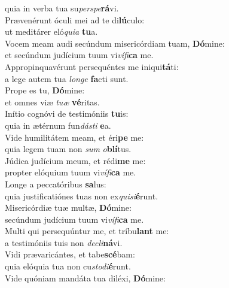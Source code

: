 \oddverse quia in verba tua su\textit{per}\textit{spe}\textbf{rá}vi.\\
\evenverse Prævenérunt óculi mei ad te di\textbf{lú}culo:~\*\\
\evenverse ut meditárer eló\textit{qui}\textit{a} \textbf{tu}a.\\
\oddverse Vocem meam audi secúndum misericórdiam tuam, \textbf{Dó}mine:~\*\\
\oddverse et secúndum judícium tuum vi\textit{ví}\textit{fi}\textbf{ca} me.\\
\evenverse Appropinquavérunt persequéntes me iniqui\textbf{tá}ti:~\*\\
\evenverse a lege autem tua \textit{lon}\textit{ge} \textbf{fa}cti sunt.\\
\oddverse Prope es tu, \textbf{Dó}mine:~\*\\
\oddverse et omnes viæ \textit{tu}\textit{æ} \textbf{vé}ritas.\\
\evenverse Inítio cognóvi de testimóniis \textbf{tu}is:~\*\\
\evenverse quia in ætérnum fun\textit{dá}\textit{sti} \textbf{e}a.\\
\oddverse Vide humilitátem meam, et éri\textbf{pe} me:~\*\\
\oddverse quia legem tuam non \textit{sum} \textit{o}\textbf{blí}tus.\\
\evenverse Júdica judícium meum, et rédi\textbf{me} me:~\*\\
\evenverse propter elóquium tuum vi\textit{ví}\textit{fi}\textbf{ca} me.\\
\oddverse Longe a peccatóribus \textbf{sa}lus:~\*\\
\oddverse quia justificatiónes tuas non ex\textit{qui}\textit{si}\textbf{é}runt.\\
\evenverse Misericórdiæ tuæ multæ, \textbf{Dó}mine:~\*\\
\evenverse secúndum judícium tuum vi\textit{ví}\textit{fi}\textbf{ca} me.\\
\oddverse Multi qui persequúntur me, et tríbu\textbf{lant} me:~\*\\
\oddverse a testimóniis tuis non \textit{de}\textit{cli}\textbf{ná}vi.\\
\evenverse Vidi prævaricántes, et tabe\textbf{scé}bam:~\*\\
\evenverse quia elóquia tua non cu\textit{sto}\textit{di}\textbf{é}runt.\\
\oddverse Vide quóniam mandáta tua diléxi, \textbf{Dó}mine:~\*\\
